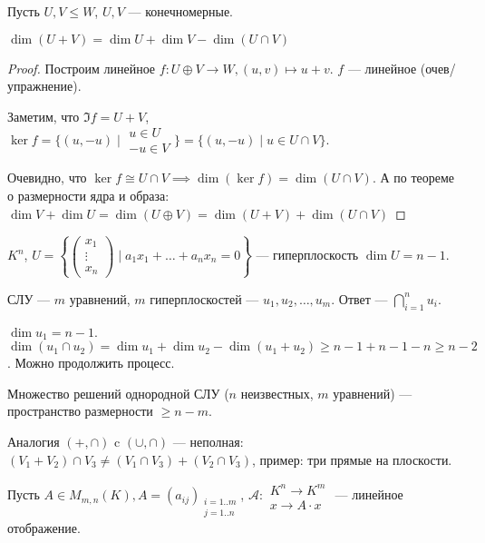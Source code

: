 \begin{theorem}
   Пусть $U, V \le W$, $U, V$ --- конечномерные.

   $\dim(U + V) = \dim U + \dim V - \dim(U \cap V)$
\end{theorem}
\begin{proof}
    Построим линейное $f\!: U \oplus V \to W, (u, v) \mapsto u + v$. $f$ --- линейное (очев/упражнение).

    Заметим, что $\Im f = U+V$,  $\ker f = \{(u, -u) \mid \begin{array}{r} u \in U \\ -u \in V \end{array} \} = \{ (u, -u) \mid u \in U \cap V \}$.

    Очевидно, что $\ker f \cong U \cap V \implies \dim (\ker f) = \dim (U \cap V)$. А по теореме о размерности ядра и образа:  $\dim V + \dim U = \dim(U \oplus V) = \dim(U + V) + \dim(U \cap V)$
\end{proof}
\begin{example}
    $K^n$, $U = \left\{ \begin{pmatrix} x_1 \\ \vdots \\ x_n \end{pmatrix} \mid a_1 x_1 + \ldots + a_n x_n = 0\right\}$ --- гиперплоскость $\dim U = n - 1$. 

    СЛУ ---  $m$ уравнений,  $m$ гиперплоскостей --- $u_1, u_2, \ldots, u_m$. Ответ --- $\bigcap\limits_{i=1}^n u_i$.

    $\dim u_1 = n - 1$. $\dim (u_1 \cap u_2) = \dim u_1 + \dim u_2 - \dim (u_1 + u_2) \ge n - 1 + n - 1 - n \ge n - 2$. Можно продолжить процесс.
\end{example}
\begin{consequence}
    Множество решений однородной СЛУ ($n$ неизвестных,  $m$ уравнений) --- пространство размерности $\ge n - m$.
\end{consequence}
\begin{remark}
    Аналогия $(+, \cap)$ c  $(\cup, \cap)$ --- неполная:  $(V_1 + V_2) \cap V_3 \neq (V_1 \cap V_3) + (V_2 \cap V_3)$, пример: три прямые на плоскости.
\end{remark}

Пусть $A \in M_{m, n}(K), A = (a_{ij})_{\substack{i = 1..m \\ j = 1..n}}$,  $\mathcal{A}\!: \begin{array}{c} K^n \to K^m \\ x \to A \cdot x \end{array}$ --- линейное отображение.

